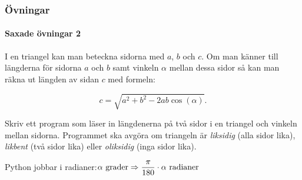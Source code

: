 \documentclass{beamer}
\begin{document}
\begin{frame}[fragile]
	\frametitle{Övningar}
	\framesubtitle{Saxade övningar 2}
	
	I en triangel kan man beteckna sidorna med \(a\), \(b\) och \(c\). Om man känner till längderna för sidorna \(a\) och \(b\) samt vinkeln \(\alpha\) mellan dessa sidor så kan man räkna ut längden av sidan \(c\) med formeln:
	
	\[
		c = \sqrt{a^2+b^2-2ab\cos (\alpha)}.
	\] 
	
	Skriv ett program som läser in längdenerna på två sidor i en triangel och vinkeln mellan sidorna. Programmet ska avgöra om triangeln är \textit{liksidig} (alla sidor lika), \textit{likbent} (två sidor lika) eller \textit{oliksidig} (inga sidor lika).
	
	Python jobbar i radianer:\( \alpha \text{ grader} \Rightarrow \dfrac{\pi}{180}\cdot \alpha\- \text{ radianer}\)
	
\end{frame}
\end{document}
